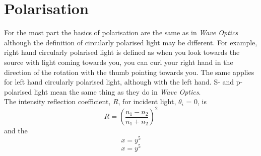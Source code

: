 \section{Polarisation}
For the most part the basics of polarisation are the same as in \textit{Wave Optics} although the definition of circularly polarised light may be different.
 For example, right hand circularly polarised light is defined as when you look towards the source with light coming towards you, you can curl your right hand in the direction of the rotation with the thumb pointing towards you. %
 The same applies for left hand circularly polarised light, although with the left hand.
 S- and p-polarised light mean the same thing as they do in \textit{Wave Optics}.
 \\
 The intensity reflection coefficient, $R$, for incident light, $\theta_i$ = 0, is
 \begin{equation}
 R = \left(\frac{n_1-n_2}{n_1+n_2}\right)^2
 \end{equation}
 and the 
 \[x=y^5\]
 $$x=y^5$$
 


